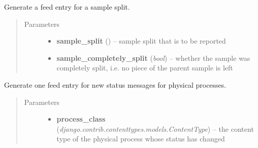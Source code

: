 \documentclass[a4paper,11pt,english]{sphinxmanual}
\begin{document}
\begin{fulllineitems}
\begin{fulllineitems}
\begin{quote}
\begin{description}
\begin{itemize}
\end{itemize}

\end{description}\end{quote}

\end{fulllineitems}


\begin{fulllineitems}
\label{programming/utilities:samples.utils.views.Reporter.report_sample_split}
Generate a feed entry for a sample split.
\begin{quote}\begin{description}
\item[{Parameters}] \leavevmode\begin{itemize}
\item {} 
\textbf{sample\_split} () -- sample split that is to be reported

\item {} 
\textbf{sample\_completely\_split} (\emph{bool}) -- whether the sample was completely split,
i.e. no piece of the parent sample is left

\end{itemize}

\end{description}\end{quote}

\end{fulllineitems}


\begin{fulllineitems}
\label{programming/utilities:samples.utils.views.Reporter.report_status_message}
Generate one feed entry for new status messages for physical
processes.
\begin{quote}\begin{description}
\item[{Parameters}] \leavevmode\begin{itemize}
\item {} 
\textbf{process\_class} (\emph{django.contrib.contenttypes.models.ContentType}) -- the content type of the physical process whose
status has changed


\end{itemize}
\end{description}
\end{quote}
\end{fulllineitems}
\end{fulllineitems}
\end{document}
